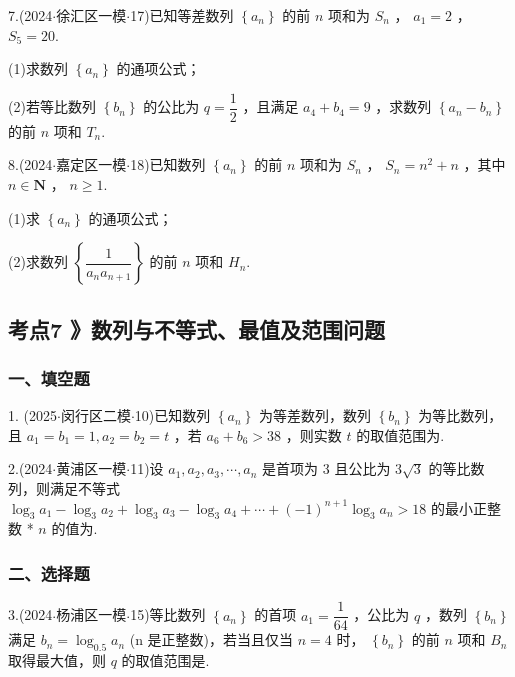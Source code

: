 7.(2024$\cdot$徐汇区一模$\cdot$17)已知等差数列 $\left\{  {a}_{n}\right\}$ 的前 $n$ 项和为 ${S}_{n}$ ， ${a}_{1} = 2$ ， ${S}_{5} = {20}$.

(1)求数列 $\left\{  {a}_{n}\right\}$ 的通项公式；

(2)若等比数列 $\left\{  {b}_{n}\right\}$ 的公比为 $q = \dfrac{1}{2}$ ，且满足 ${a}_{4} + {b}_{4} = 9$ ，求数列 $\left\{  {{a}_{n} - {b}_{n}}\right\}$ 的前 $n$ 项和 ${T}_{n}$.

8.(2024$\cdot$嘉定区一模$\cdot$18)已知数列 $\left\{  {a}_{n}\right\}$ 的前 $n$ 项和为 ${S}_{n}$ ， ${S}_{n} = {n}^{2} + n$ ，其中 $n \in  \mathbf{N}$ ， $n \geq  1$.

(1)求 $\left\{  {a}_{n}\right\}$ 的通项公式；

(2)求数列 $\left\{  \dfrac{1}{{a}_{n}{a}_{n + 1}}\right\}$ 的前 $n$ 项和 ${H}_{n}$.

\subsection*{考点7 》数列与不等式、最值及范围问题}

\subsubsection*{一、填空题}

1. (2025$\cdot$闵行区二模$\cdot$10)已知数列 $\left\{  {a}_{n}\right\}$ 为等差数列，数列 $\left\{  {b}_{n}\right\}$ 为等比数列，且 ${a}_{1} = {b}_{1} = 1,{a}_{2} = {b}_{2} =  t$ ，若 ${a}_{6} + {b}_{6} > {38}$ ，则实数 $t$ 的取值范围为\blkda[2]{}.

2.(2024$\cdot$黄浦区一模$\cdot$11)设 ${a}_{1},{a}_{2},{a}_{3},\cdots ,{a}_{n}$ 是首项为 3 且公比为 $3\sqrt{3}$ 的等比数列，则满足不等式 ${\log }_{3}{a}_{1} - {\log }_{3}{a}_{2} + {\log }_{3}{a}_{3} - {\log }_{3}{a}_{4} + \cdots  + {\left( -1\right) }^{n + 1}{\log }_{3}{a}_{n} > {18}$ 的最小正整数 * $n$ 的值为\blkda[2]{}.

\subsubsection*{二、选择题}

3.(2024$\cdot$杨浦区一模$\cdot$15)等比数列 $\left\{  {a}_{n}\right\}$ 的首项 ${a}_{1} = \dfrac{1}{64}$ ，公比为 $q$ ，数列 $\left\{  {b}_{n}\right\}$ 满足 ${b}_{n} = {\log }_{0.5}{a}_{n}$ (n 是正整数)，若当且仅当 $n = 4$ 时， $\left\{  {b}_{n}\right\}$ 的前 $n$ 项和 ${B}_{n}$ 取得最大值，则 $q$ 的取值范围是\blkda[2]{}. \dotfill{(\kh{})}

